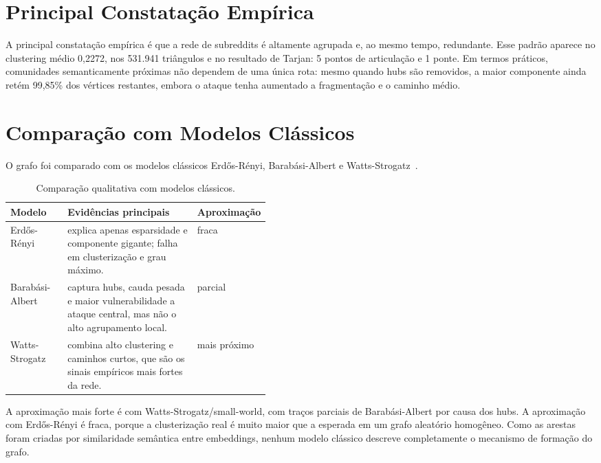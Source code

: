 \documentclass[sigconf]{webmedia}
\begin{document}
\clearpage

\section{Principal Constatação Empírica}

A principal constatação empírica é que a rede de subreddits é altamente
agrupada e, ao mesmo tempo, redundante. Esse padrão aparece no
clustering médio 0,2272, nos 531.941 triângulos e no resultado de
Tarjan: 5 pontos de articulação e 1 ponte. Em termos práticos,
comunidades semanticamente próximas não dependem de uma única rota:
mesmo quando hubs são removidos, a maior componente ainda retém 99,85\%
dos vértices restantes, embora o ataque tenha aumentado a fragmentação e
o caminho médio.

\section{Comparação com Modelos Clássicos}

O grafo foi comparado com os modelos clássicos Erdős-Rényi, Barabási-Albert e
Watts-Strogatz~\cite{erdos1959random,barabasi1999emergence,watts1998collective}.

\begin{table}[H]
  \caption{Comparação qualitativa com modelos clássicos.}
  \label{tab:modelos}
  \small
  \setlength{\tabcolsep}{3pt}
  \begin{tabularx}{\linewidth}{@{}p{0.22\linewidth}Xp{0.22\linewidth}@{}}
    \toprule
    Modelo & Evidências principais & Aproximação \\
    \midrule
    Erdős-Rényi & explica apenas esparsidade e componente gigante; falha em clusterização e grau máximo. & fraca \\
    Barabási-Albert & captura hubs, cauda pesada e maior vulnerabilidade a ataque central, mas não o alto agrupamento local. & parcial \\
    Watts-Strogatz & combina alto clustering e caminhos curtos, que são os sinais empíricos mais fortes da rede. & mais próximo \\
    \bottomrule
  \end{tabularx}
\end{table}

A aproximação mais forte é com Watts-Strogatz/small-world, com traços
parciais de Barabási-Albert por causa dos hubs. A aproximação com
Erdős-Rényi é fraca, porque a clusterização real é muito maior que a
esperada em um grafo aleatório homogêneo. Como as arestas foram
criadas por similaridade semântica entre embeddings, nenhum modelo
clássico descreve completamente o mecanismo de formação do grafo.
\end{document}
